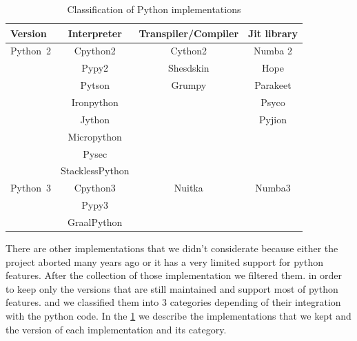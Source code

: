\begin{table}[hbt]
    \caption{Classification of Python implementations}
    \label{fig:pythonimplementations}
    \center
    \begin{tabular}{|l|c|c|c|}
        \hline
        Version  & Interpreter     & Transpiler/Compiler & Jit library \\
        \hline
        \hline
        Python~2 & Cpython2        & Cython2             & Numba 2     \\
                 & Pypy2           & Shesdskin           & Hope        \\
                 & Pytson          & Grumpy              & Parakeet    \\
                 & Ironpython      &                     & Psyco       \\
                 & Jython          &                     & Pyjion      \\
                 & Micropython     &                     &             \\
                 & Pysec           &                     &             \\
                 & StacklessPython &                     &             \\
        \hline
        Python~3 & Cpython3        & Nuitka              & Numba3      \\
                 & Pypy3           &                     &             \\
                 & GraalPython     &                     &             \\
        \hline
    \end{tabular}
\end{table}

There are other implementations that we didn't considerate because either the project aborted many years ago or it has a very limited support for python features.
After the collection of those implementation we filtered them. in order to keep only the versions that are still maintained and support most of python features.
and we classified them into 3 categories depending of their integration with the python code.  In the \ref{fig:pythonimplementations} we describe the implementations that we kept and the version of each implementation and its category.


